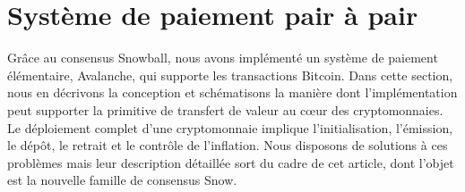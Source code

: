 \documentclass[a4,twocolumn,10pt]{article}
\newcommand{\tronly}[2]{#1}
\theoremstyle{definition}
\begin{document}



\section{Système de paiement pair à pair}
\label{sec:implementation}


Grâce au consensus Snowball, nous avons implémenté un système de paiement élémentaire, Avalanche, qui supporte les transactions Bitcoin. Dans cette section, nous en décrivons la conception et schématisons la manière dont l'implémentation peut supporter la primitive de transfert de valeur au cœur des cryptomonnaies.
Le déploiement complet d'une cryptomonnaie implique l'initialisation, l'émission, le dépôt, le retrait et le contrôle de l'inflation. Nous disposons de solutions à ces problèmes mais leur description détaillée sort du cadre de cet article, dont l'objet est la nouvelle famille de consensus Snow.
\end{document}
